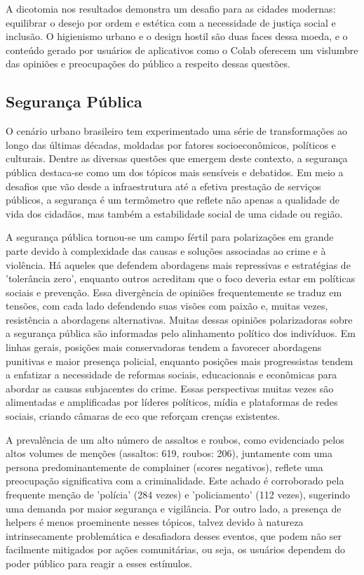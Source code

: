 A dicotomia nos resultados demonstra um desafio para as cidades modernas: equilibrar o desejo por ordem e estética com a necessidade de justiça social e inclusão. O higienismo urbano e o design hostil são duas faces dessa moeda, e o conteúdo gerado por usuários de aplicativos como o Colab oferecem um vislumbre das opiniões e preocupações do público a respeito dessas questões.

\subsection{Segurança Pública}

O cenário urbano brasileiro tem experimentado uma série de transformações ao longo das últimas décadas, moldadas por fatores socioeconômicos, políticos e culturais. Dentre as diversas questões que emergem deste contexto, a segurança pública destaca-se como um dos tópicos mais sensíveis e debatidos. Em meio a desafios que vão desde a infraestrutura até a efetiva prestação de serviços públicos, a segurança é um termômetro que reflete não apenas a qualidade de vida dos cidadãos, mas também a estabilidade social de uma cidade ou região.

A segurança pública tornou-se um campo fértil para polarizações em grande parte devido à complexidade das causas e soluções associadas ao crime e à violência. Há aqueles que defendem abordagens mais repressivas e estratégias de 'tolerância zero', enquanto outros acreditam que o foco deveria estar em políticas sociais e prevenção. Essa divergência de opiniões frequentemente se traduz em tensões, com cada lado defendendo suas visões com paixão e, muitas vezes, resistência a abordagens alternativas. Muitas dessas opiniões polarizadoras sobre a segurança pública são informadas pelo alinhamento político dos indivíduos. Em linhas gerais, posições mais conservadoras tendem a favorecer abordagens punitivas e maior presença policial, enquanto posições mais progressistas tendem a enfatizar a necessidade de reformas sociais, educacionais e econômicas para abordar as causas subjacentes do crime. Essas perspectivas muitas vezes são alimentadas e amplificadas por líderes políticos, mídia e plataformas de redes sociais, criando câmaras de eco que reforçam crenças existentes.

A prevalência de um alto número de assaltos e roubos, como evidenciado pelos altos volumes de menções (assaltos: 619, roubos: 206), juntamente com uma persona predominantemente de complainer (scores negativos), reflete uma preocupação significativa com a criminalidade. Este achado é corroborado pela frequente menção de 'polícia' (284 vezes) e 'policiamento' (112 vezes), sugerindo uma demanda por maior segurança e vigilância. Por outro lado, a presença de helpers é menos proeminente nesses tópicos, talvez devido à natureza intrinsecamente problemática e desafiadora desses eventos, que podem não ser facilmente mitigados por ações comunitárias, ou seja, os usuários dependem do poder público para reagir a esses estímulos.

